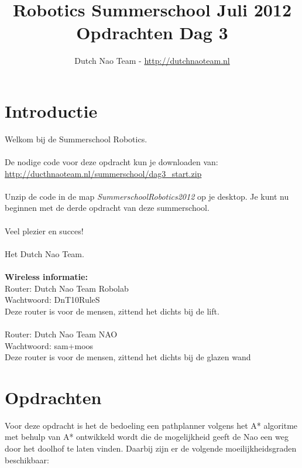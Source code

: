 \documentclass[a4paper]{article}
\title{\textbf{Robotics Summerschool Juli 2012} \\ Opdrachten Dag 3}
\author{Dutch Nao Team - \url{http://dutchnaoteam.nl}}
\date{}
\begin{document}
\maketitle

\section{Introductie}
Welkom bij de Summerschool Robotics.\\
\\
De nodige code voor deze opdracht kun je downloaden van:\\ \url{http://ducthnaoteam.nl/summerschool/dag3\_start.zip}\\
\\
Unzip de code in de map \textit{SummerschoolRobotics2012} op je desktop. Je kunt nu beginnen met de derde opdracht van deze summerschool. \\
\\
Veel plezier en succes!\\
\\
Het Dutch Nao Team.\\
\\
\textbf{Wireless informatie:}\\
Router:  Dutch Nao Team Robolab\\
Wachtwoord: DnT10RuleS\\
Deze router is voor de mensen, zittend het dichts bij de lift.\\
\\
Router:  Dutch Nao Team NAO\\
Wachtwoord: sam+moos\\
Deze router is voor de mensen, zittend het dichts bij de glazen wand


\tableofcontents

\newpage


\section{Opdrachten}
Voor deze opdracht is het de bedoeling een pathplanner volgens het A* algoritme met behulp van A* ontwikkeld wordt die de mogelijkheid geeft de Nao een weg door het doolhof te laten vinden. Daarbij zijn er de volgende moeilijkheidsgraden beschikbaar:
\end{document}
